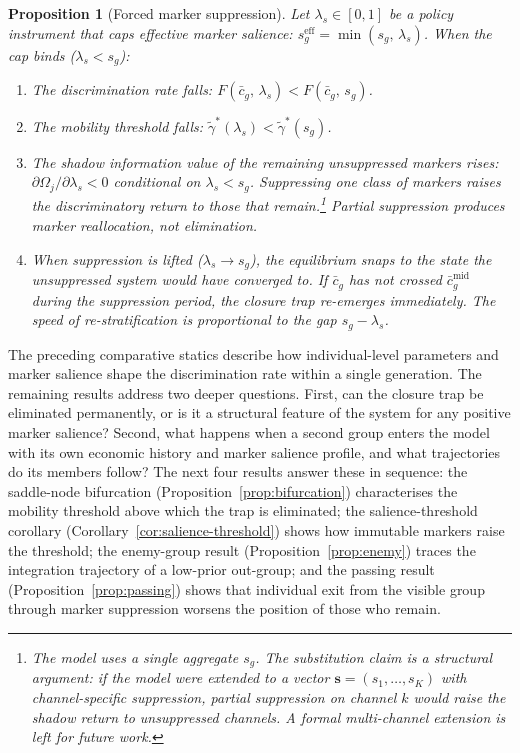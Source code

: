 \documentclass[12pt,a4paper]{article}
\newtheorem{proposition}{Proposition}
\theoremstyle{definition}
\numberwithin{proposition}{subsection}
\begin{document}
\begin{proposition}[Forced marker suppression]
\label{prop:suppression}
Let $\lambda_s \in [0,1]$ be a policy instrument that caps effective
marker salience: $s_g^{\mathrm{eff}} = \min(s_g,\, \lambda_s)$.
When the cap binds ($\lambda_s < s_g$):
\begin{enumerate}[noitemsep]
  \item The discrimination rate falls:
  $F(\bar{c}_g,\, \lambda_s) < F(\bar{c}_g,\, s_g)$.
  \item The mobility threshold falls:
  $\tilde{\gamma}^*(\lambda_s) < \tilde{\gamma}^*(s_g)$.
  \item The shadow information value of the remaining unsuppressed
  markers rises: $\partial \Omega_j / \partial \lambda_s < 0$
  conditional on $\lambda_s < s_g$. Suppressing one class of markers
  raises the discriminatory return to those that remain.\footnote{The
  model uses a single aggregate $s_g$. The substitution claim is a
  structural argument: if the model were extended to a vector
  $\mathbf{s} = (s_1, \ldots, s_K)$ with channel-specific
  suppression, partial suppression on channel $k$ would raise
  the shadow return to unsuppressed channels. A formal
  multi-channel extension is left for future work.} Partial
  suppression produces marker reallocation, not elimination.
  \item When suppression is lifted ($\lambda_s \to s_g$), the
  equilibrium snaps to the state the unsuppressed system would
  have converged to. If $\bar{c}_g$ has not crossed
  $\bar{c}_g^{\mathrm{mid}}$ during the suppression period, the
  closure trap re-emerges immediately. The speed of
  re-stratification is proportional to the gap
  $s_g - \lambda_s$.
\end{enumerate}
\end{proposition}

The preceding comparative statics describe how individual-level
parameters and marker salience shape the discrimination rate within
a single generation. The remaining results address two deeper
questions. First, can the closure trap be eliminated permanently, or
is it a structural feature of the system for any positive marker
salience? Second, what happens when a second group enters the model
with its own economic history and marker salience profile, and what
trajectories do its members follow? The next four results answer
these in sequence: the saddle-node bifurcation
(Proposition~\ref{prop:bifurcation}) characterises the mobility
threshold above which the trap is eliminated; the salience-threshold
corollary (Corollary~\ref{cor:salience-threshold}) shows how
immutable markers raise the threshold; the enemy-group result
(Proposition~\ref{prop:enemy}) traces the integration trajectory of
a low-prior out-group; and the passing result
(Proposition~\ref{prop:passing}) shows that individual exit from
the visible group through marker suppression worsens the position
of those who remain.
\end{document}
